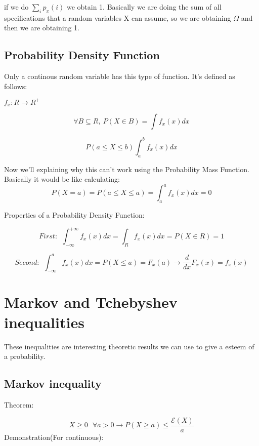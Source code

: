 \documentclass{article}
\begin{document}
\bigskip

if we do $\sum_{i} p_x(i)$ we obtain 1. Basically we are doing the sum of all specifications that a random variables X can assume, so we are obtaining $\Omega$ and then we are obtaining 1.

\subsection{Probability Density Function}

Only a continous random variable has this type of function. It's defined as follows:

$f_x : R \rightarrow R^+$

\bigskip

$$\forall B \subseteq R, \ P(X \in B) = \int f_x(x)dx$$

$$P(a \leq X \leq b) \int_{a}^{b} f_x(x)dx$$

Now we'll explaining why this can't work using the Probability Mass Function. Basically it would be like calculating: $$P(X = a) = P(a \leq X \leq a) = \int_{a}^{a} f_x(x)dx = 0$$

\bigskip

\bigskip

\bigskip

\bigskip

\bigskip

Properties of a Probability Density Function:

$$First: \ \ \int_{- \infty}^{+ \infty} f_x(x)dx = \int_{R} f_x(x)dx = P(X \in R) = 1$$

$$Second: \ \ \int_{- \infty}^{a} f_x(x)dx = P(X \leq a) = F_x(a) \longrightarrow \frac{d}{dx} F_x(x) = f_x(x)$$

\section{Markov and Tchebyshev inequalities}

These inequalities are interesting theoretic results we can use to give a esteem of a probability.
\bigskip

\subsection{Markov inequality}

Theorem:
\bigskip

$$X \geq 0 \ \ \  \forall a > 0 \rightarrow P(X \geq a) \leq \frac{\mathcal E(X)}{a}$$
\bigskip
Demonstration(For continuous):
\end{document}
